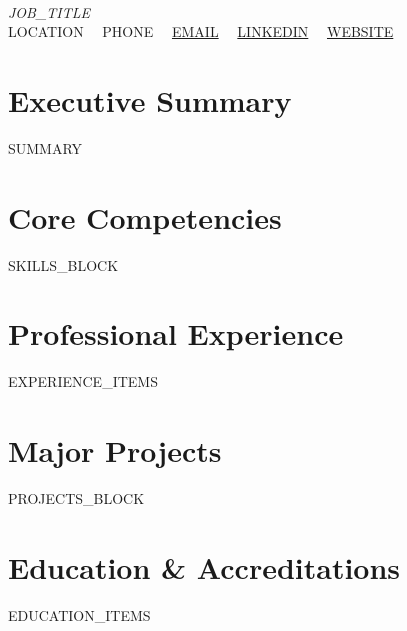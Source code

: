 \documentclass[9.5pt,letterpaper]{article}
\begin{document}
\begin{center}
  {\LARGE \textbf{}} \\[2pt]
  {\small \textit{{{JOB_TITLE}}}} \\[3pt]
  \footnotesize
  {{LOCATION}} \ \textbar \ 
  {{PHONE}} \ \textbar \ 
  \href{mailto:{{EMAIL}}}{{{EMAIL}}} \ \textbar \ 
  \href{https://{{LINKEDIN}}}{{{LINKEDIN}}} \ \textbar \ 
  \href{https://{{WEBSITE}}}{{{WEBSITE}}}
\end{center}

\vspace{-4pt}

\section{Executive Summary}
\footnotesize
{{SUMMARY}}

\section{Core Competencies}
\footnotesize
{{SKILLS_BLOCK}}

\section{Professional Experience}
\footnotesize
{{EXPERIENCE_ITEMS}}

\section{Major Projects}
\footnotesize
{{PROJECTS_BLOCK}}

\section{Education \& Accreditations}
\footnotesize
{{EDUCATION_ITEMS}}
\end{document}
